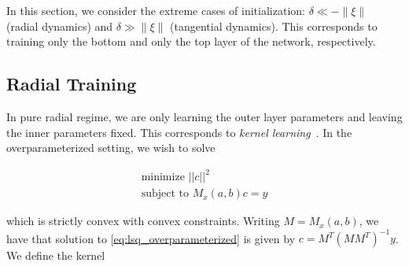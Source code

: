 In this section, we consider the extreme cases of initialization: $\delta \ll -\|\xi\|$ (radial dynamics) and $\delta \gg \|\xi\|$ (tangential dynamics). This corresponds to training only the bottom and only the top layer of the network, respectively. 




\subsection{Radial Training}


In pure radial regime, we are only learning the outer layer parameters and leaving the inner parameters fixed. This corresponds to \emph{kernel learning}~. In the overparameterized setting, we wish to solve

\begin{equation}\label{eq:lsq_overparameterized}
\begin{gathered} 
    \text{minimize } ||c||^2\\
    \text{subject to } M_x(a, b) c = y
\end{gathered}
\end{equation}

which is strictly convex with convex constraints. Writing $M = M_x(a,b)$, we have that solution to \eqref{eq:lsq_overparameterized} is given by $c = M^T (M M^T)^{-1} y$. We define the kernel

